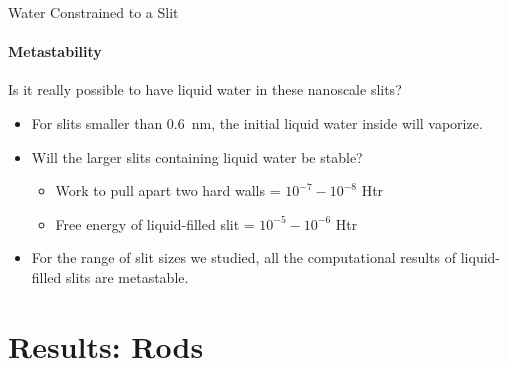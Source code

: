 \documentclass{beamer}
\begin{document}
\begin{frame}[fragile]{Water Constrained to a Slit}
\framesubtitle{Metastability}
Is it really possible to have liquid water in these nanoscale slits?
\vspace{0.5cm}
\begin{itemize}
 \item <2-> For slits smaller than 0.6~nm, the initial liquid water inside will
vaporize.
 \vspace{0.5cm}
 \item <3-> Will the larger slits containing liquid water be stable?
  \begin{itemize}
    \item <4-> Work to pull apart two hard walls = $10^{-7} - 10^{-8}$ Htr
    \item <4-> Free energy of liquid-filled slit = $10^{-5} - 10^{-6}$ Htr
  \end{itemize}
 \vspace{0.5cm}
 \item <5-> For the range of slit sizes we
studied, all the computational results of liquid-filled slits are
metastable.  
\end{itemize}
\end{frame}

\section{Results: Rods}
\subsection*{}
\end{document}
